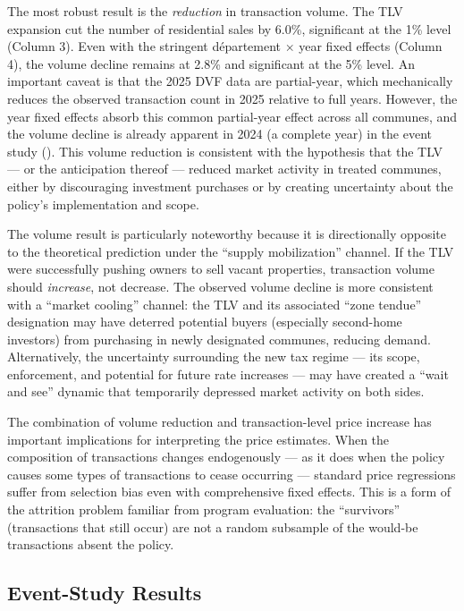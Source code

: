 \documentclass[12pt]{article}
\begin{document}
The most robust result is the \textit{reduction} in transaction volume. The TLV expansion cut the number of residential sales by 6.0\%, significant at the 1\% level (Column 3). Even with the stringent d\'epartement $\times$ year fixed effects (Column 4), the volume decline remains at 2.8\% and significant at the 5\% level. An important caveat is that the 2025 DVF data are partial-year, which mechanically reduces the observed transaction count in 2025 relative to full years. However, the year fixed effects absorb this common partial-year effect across all communes, and the volume decline is already apparent in 2024 (a complete year) in the event study (). This volume reduction is consistent with the hypothesis that the TLV --- or the anticipation thereof --- reduced market activity in treated communes, either by discouraging investment purchases or by creating uncertainty about the policy's implementation and scope.

The volume result is particularly noteworthy because it is directionally opposite to the theoretical prediction under the ``supply mobilization'' channel. If the TLV were successfully pushing owners to sell vacant properties, transaction volume should \textit{increase}, not decrease. The observed volume decline is more consistent with a ``market cooling'' channel: the TLV and its associated ``zone tendue'' designation may have deterred potential buyers (especially second-home investors) from purchasing in newly designated communes, reducing demand. Alternatively, the uncertainty surrounding the new tax regime --- its scope, enforcement, and potential for future rate increases --- may have created a ``wait and see'' dynamic that temporarily depressed market activity on both sides.

The combination of volume reduction and transaction-level price increase has important implications for interpreting the price estimates. When the composition of transactions changes endogenously --- as it does when the policy causes some types of transactions to cease occurring --- standard price regressions suffer from selection bias even with comprehensive fixed effects. This is a form of the attrition problem familiar from program evaluation: the ``survivors'' (transactions that still occur) are not a random subsample of the would-be transactions absent the policy.

\subsection{Event-Study Results}
\end{document}
